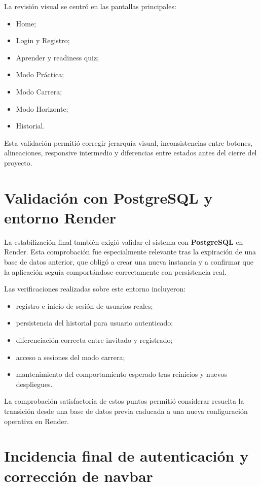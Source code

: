 La revisión visual se centró en las pantallas principales:

\begin{itemize}
    \item Home;
    \item Login y Registro;
    \item Aprender y readiness quiz;
    \item Modo Práctica;
    \item Modo Carrera;
    \item Modo Horizonte;
    \item Historial.
\end{itemize}

Esta validación permitió corregir jerarquía visual, inconsistencias entre botones, alineaciones, responsive intermedio y diferencias entre estados antes del cierre del proyecto.

\section{Validación con PostgreSQL y entorno Render}

La estabilización final también exigió validar el sistema con \textbf{PostgreSQL} en Render. Esta comprobación fue especialmente relevante tras la expiración de una base de datos anterior, que obligó a crear una nueva instancia y a confirmar que la aplicación seguía comportándose correctamente con persistencia real.

Las verificaciones realizadas sobre este entorno incluyeron:

\begin{itemize}
    \item registro e inicio de sesión de usuarios reales;
    \item persistencia del historial para usuario autenticado;
    \item diferenciación correcta entre invitado y registrado;
    \item acceso a sesiones del modo carrera;
    \item mantenimiento del comportamiento esperado tras reinicios y nuevos despliegues.
\end{itemize}

La comprobación satisfactoria de estos puntos permitió considerar resuelta la transición desde una base de datos previa caducada a una nueva configuración operativa en Render.

\section{Incidencia final de autenticación y corrección de navbar}

